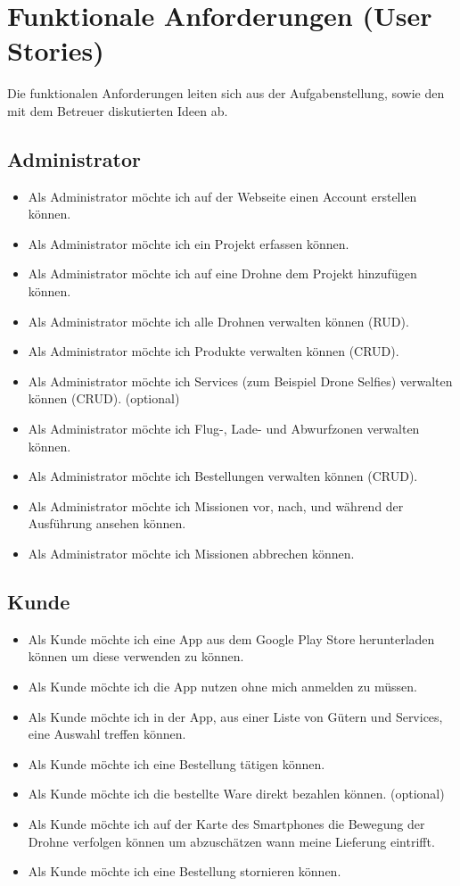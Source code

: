 \section{Funktionale Anforderungen (User Stories)}

Die funktionalen Anforderungen leiten sich aus der Aufgabenstellung, sowie den mit dem Betreuer diskutierten Ideen ab.

\subsection{Administrator}
\begin{itemize}
\item Als Administrator möchte ich auf der Webseite einen Account erstellen können.
\item Als Administrator möchte ich ein Projekt erfassen können.
\item Als Administrator möchte ich auf eine Drohne dem Projekt hinzufügen können.
\item Als Administrator möchte ich alle Drohnen verwalten können (RUD).
\item Als Administrator möchte ich Produkte verwalten können (CRUD).
\item Als Administrator möchte ich Services (zum Beispiel Drone Selfies) verwalten können (CRUD). (optional)
\item Als Administrator möchte ich Flug-, Lade- und Abwurfzonen verwalten können.
\item Als Administrator möchte ich Bestellungen verwalten können (CRUD).


\item Als Administrator möchte ich Missionen vor, nach, und während der Ausführung ansehen können.
\item Als Administrator möchte ich Missionen abbrechen können.
\end{itemize}

\subsection{Kunde}
\begin{itemize}
\item Als Kunde möchte ich eine App aus dem Google Play Store herunterladen können um diese verwenden zu können.
\item Als Kunde möchte ich die App nutzen ohne mich anmelden zu müssen.
\item Als Kunde möchte ich in der App, aus einer Liste von Gütern und Services, eine Auswahl treffen können.
\item Als Kunde möchte ich eine Bestellung tätigen können.
\item Als Kunde möchte ich die bestellte Ware direkt bezahlen können. (optional)
\item Als Kunde möchte ich auf der Karte des Smartphones die Bewegung der Drohne verfolgen können um abzuschätzen wann meine Lieferung eintrifft.
\item Als Kunde möchte ich eine Bestellung stornieren können.
\end{itemize}

